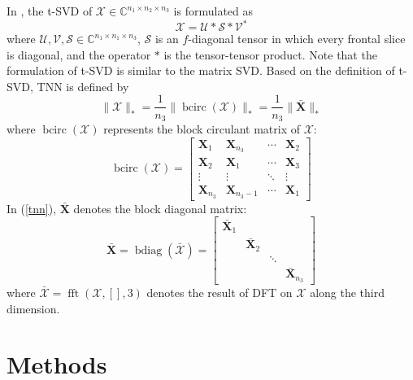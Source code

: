 \documentclass{article}
\begin{document}
In \cite{ref_tsvd}, the t-SVD of $\mathcal{X} \in \mathbb{C}^{n_1 \times n_2 \times n_3}$ is formulated as 
\begin{equation}
\mathcal{X}=\mathcal{U} * \mathcal{S} * \mathcal{V}^{*}
\end{equation}
where $\mathcal{U}, \mathcal{V}, \mathcal{S} \in \mathbb{C}^{n_{1} \times n_{1} \times n_{3}}$, $\mathcal{S}$ is an $f$-diagonal tensor in which every frontal slice is diagonal, and the operator $*$ is the tensor-tensor product. Note that the formulation of t-SVD is similar to the matrix SVD. Based on the definition of t-SVD, TNN \cite{ref_tnn1} is defined by 
\begin{equation}
  \label{tnn}
\|\mathcal{X}\|_{*}=\frac{1}{n_{3}}\|\operatorname{bcirc}(\mathcal{X})\|_{*}=\frac{1}{n_{3}}\|\bar{\mathbf X}\|_{*}
\end{equation}
where $\operatorname{bcirc}(\mathcal{X})$ represents the block circulant matrix of $\mathcal{X}$:
\begin{equation}
  \label{bcirc}
  \operatorname{bcirc}(\mathcal{X})=
  \left[
    \begin{array}{cccc}
    \mathbf X_1& \mathbf X_{n_3} & \cdots & \mathbf X_2 \\
    \mathbf X_2& \mathbf X_1 & \cdots & \mathbf X_3 \\
    \vdots & \vdots & \ddots & \vdots \\
    \mathbf X_{n_3} & \mathbf X_{n_3-1} & \cdots & \mathbf X_1
    \end{array}
  \right]
\end{equation}
In (\ref{tnn}), $\bar{\mathbf X}$ denotes the block diagonal matrix:
\begin{equation}
  \label{bdiag}
\bar{\mathbf X}=\operatorname{bdiag}(\bar{\mathcal{X}})=\left[\begin{array}{llll}
\bar{\mathbf X}_1 & & & \\
& \bar{\mathbf X}_2 & & \\
& & \ddots & \\
& & & \bar{\mathbf X}_{n_3}
\end{array}\right]
\end{equation}
where $\bar{\mathcal{X}}=\operatorname{fft}(\mathcal{X},[],3)$ denotes the result of DFT on $\mathcal{X}$ along the third dimension.

\section{Methods}
\label{sec:Methods}
\end{document}
